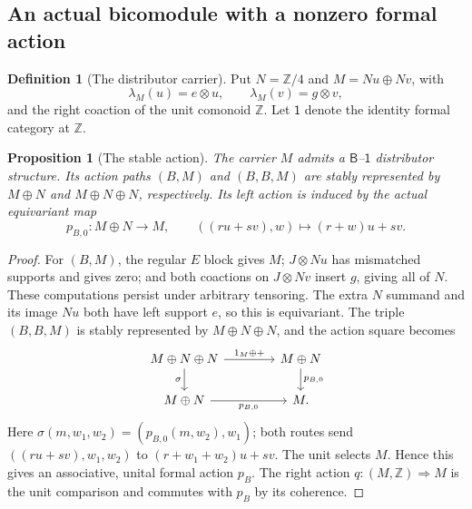 \documentclass[11pt,a4paper]{article}
\newtheorem{proposition}[theorem]{Proposition}
\theoremstyle{definition}
\newtheorem{definition}[theorem]{Definition}
\theoremstyle{remark}
\numberwithin{equation}{section}
\newcommand{\Z}{\mathbb Z}
\newcommand{\Icat}{\mathsf 1}
\newcommand{\cell}{\mathrel{\Longrightarrow}}
\begin{document}
\subsection{An actual bicomodule with a nonzero formal action}

\begin{definition}[The distributor carrier]\label{def:M}
Put $N=\Z/4$ and $M=Nu\oplus Nv$, with
\[
\lambda_M(u)=e\otimes u,\qquad
\lambda_M(v)=g\otimes v,
\]
and the right coaction of the unit comonoid $\Z$.
Let $\Icat$ denote the identity formal category at $\Z$.
\end{definition}

\begin{proposition}[The stable action]\label{prop:stable-action}
The carrier $M$ admits a $\mathsf B$--$\Icat$ distributor structure.
Its action paths $(B,M)$ and $(B,B,M)$ are stably represented by
$M\oplus N$ and $M\oplus N\oplus N$, respectively. Its left action
is induced by the actual equivariant map
\[
p_{B,0}:M\oplus N\longrightarrow M,\qquad
((ru+sv),w)\longmapsto(r+w)u+sv.
\]
\end{proposition}
\begin{proof}
For $(B,M)$, the regular $E$ block gives $M$;
$J\otimes Nu$ has mismatched supports and gives zero; and both
coactions on $J\otimes Nv$ insert $g$, giving all of $N$.
These computations persist under arbitrary tensoring.
The extra $N$ summand and its image $Nu$ both have left support $e$,
so this is equivariant. The triple $(B,B,M)$ is stably represented by
$M\oplus N\oplus N$, and the action square becomes
\[
\begin{tikzcd}[column sep=4em]
M\oplus N\oplus N \arrow[r,"1_M\oplus+"] \arrow[d,"\sigma"'] &
M\oplus N \arrow[d,"p_{B,0}"]\\
M\oplus N \arrow[r,"p_{B,0}"'] & M.
\end{tikzcd}
\]
Here $\sigma(m,w_1,w_2)=(p_{B,0}(m,w_2),w_1)$; both routes send
$((ru+sv),w_1,w_2)$ to $(r+w_1+w_2)u+sv$. The unit selects $M$.
Hence this gives an associative, unital formal action $p_B$.
The right action $q:(M,\Z)\cell M$ is the unit comparison and commutes
with $p_B$ by its coherence.
\end{proof}
\end{document}
